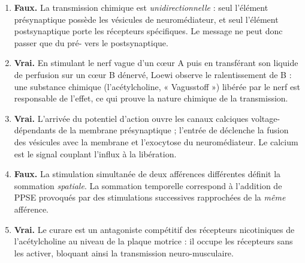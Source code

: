 \documentclass[11pt]{article}
\begin{document}
\begin{corrige}
\begin{enumerate}
\item \textbf{Faux.} La transmission chimique est \emph{unidirectionnelle} : seul l'élément présynaptique possède les vésicules de neuromédiateur, et seul l'élément postsynaptique porte les récepteurs spécifiques. Le message ne peut donc passer que du pré- vers le postsynaptique.
\item \textbf{Vrai.} En stimulant le nerf vague d'un cœur A puis en transférant son liquide de perfusion sur un cœur B dénervé, Loewi observe le ralentissement de B : une substance chimique (l'acétylcholine, « Vagusstoff ») libérée par le nerf est responsable de l'effet, ce qui prouve la nature chimique de la transmission.
\item \textbf{Vrai.} L'arrivée du potentiel d'action ouvre les canaux calciques voltage-dépendants de la membrane présynaptique ; l'entrée de  déclenche la fusion des vésicules avec la membrane et l'exocytose du neuromédiateur. Le calcium est le signal couplant l'influx à la libération.
\item \textbf{Faux.} La stimulation simultanée de deux afférences différentes définit la sommation \emph{spatiale}. La sommation temporelle correspond à l'addition de PPSE provoqués par des stimulations successives rapprochées de la \emph{même} afférence.
\item \textbf{Vrai.} Le curare est un antagoniste compétitif des récepteurs nicotiniques de l'acétylcholine au niveau de la plaque motrice : il occupe les récepteurs sans les activer, bloquant ainsi la transmission neuro-musculaire.
\end{enumerate}
\end{corrige}
\end{document}
